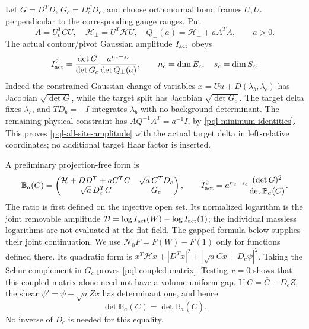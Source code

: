 \documentclass[11pt]{article}
\theoremstyle{remark}
\begin{document}
Let $G=D^TD$, $G_c=D_c^TD_c$, and choose orthonormal bond frames
$U,U_c$ perpendicular to the corresponding gauge ranges. Put
\begin{equation}
 A=U_c^TCU,\quad \mathcal H_\perp=U^T\mathcal H U,\quad
 Q_\perp(a)=\mathcal H_\perp+aA^TA,\qquad a>0.
 \label{pql-physical-auxiliary}
\end{equation}
The actual contour/pivot Gaussian amplitude $I_{\rm act}$ obeys
\begin{equation}
 I_{\rm act}^2
 =\frac{\det G}{\det G_c}
   \frac{a^{n_c-s_c}}{\det Q_\perp(a)},\qquad
 n_c=\dim E_c,\quad s_c=\dim S_c.
 \label{pql-all-site-amplitude}
\end{equation}
Indeed the constrained Gaussian change of variables
$x=Uu+D(\lambda_b,\lambda_c)$ has Jacobian $\sqrt{\det G}$,
while the target split has Jacobian $\sqrt{\det G_c}$.
The target delta fixes $\lambda_c$, and $TD_b=-I$ integrates
$\lambda_b$ with no background determinant. The remaining physical
constraint has $AQ_\perp^{-1}A^T=a^{-1}I$, by
\eqref{pql-minimum-identities}. This proves
\eqref{pql-all-site-amplitude} with the actual target delta in
left-relative coordinates; no additional target Haar factor is inserted.

A preliminary projection-free form is
\begin{equation}
 \mathbb B_a(C)=
 \begin{pmatrix}
 \mathcal H+DD^T+aC^TC&\sqrt a\,C^TD_c\\
 \sqrt a\,D_c^TC&G_c
 \end{pmatrix},\qquad
 I_{\rm act}^2=a^{n_c-s_c}
                   \frac{(\det G)^2}{\det\mathbb B_a(C)}.
 \label{pql-coupled-matrix}
\end{equation}
The ratio is first defined on the injective open set. Its normalized
logarithm is the joint removable amplitude
$\mathcal D=\log I_{\rm act}(W)-\log I_{\rm act}(1)$; the individual
massless logarithms are not evaluated at the flat field. The gapped
formula below supplies their joint continuation. We use
$\mathcal N_0F=F(W)-F(1)$ only for functions defined there.
Its quadratic form is
$x^T\mathcal Hx+|D^Tx|^2+|\sqrt a Cx+D_c\psi|^2$.
Taking the Schur complement in $G_c$ proves
\eqref{pql-coupled-matrix}. Testing $x=0$ shows that this coupled
matrix alone need not have a volume-uniform gap.
If $C=\bar C+D_cZ$, the shear
$\psi'=\psi+\sqrt a Zx$ has determinant one, and hence
\begin{equation}
 \det\mathbb B_a(C)=\det\mathbb B_a(\bar C).
 \label{pql-shear}
\end{equation}
No inverse of $D_c$ is needed for this equality.
\end{document}
